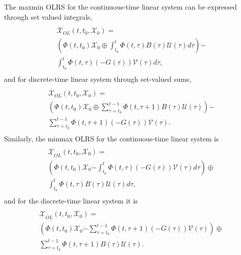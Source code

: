 \documentclass[letterpaper,10pt,english]{sphinxmanual}
\begin{document}
The maxmin OLRS for the continuous-time linear system can be expressed
through set valued integrals,
\label{chap_reach:equation-ctlsmaxmin}\begin{gather}
\begin{split}\begin{array}{l}
\overline{{\mathcal X}}_{OL}(t, t_0, {\mathcal X}_0) = \\
\left(\Phi(t, t_0){\mathcal X}_0 \oplus
\int_{t_0}^t\Phi(t, \tau)B(\tau){\mathcal U}(\tau)d\tau\right) \dot{-} \\
\int_{t_0}^t\Phi(t, \tau)(-G(\tau)){\mathcal V}(\tau)d\tau,
\end{array}\end{split}\label{chap_reach-ctlsmaxmin}
\end{gather}
and for discrete-time linear system through set-valued sums,
\label{chap_reach:equation-dtlsmaxmin}\begin{gather}
\begin{split}\begin{array}{l}
\overline{{\mathcal X}}_{OL}(t, t_0, {\mathcal X}_0) = \\
\left(\Phi(t, t_0){\mathcal X}_0 \oplus \sum_{\tau=t_0}^{t-1}\Phi(t, \tau+1)B(\tau){\mathcal U}(\tau)\right) \dot{-} \\
\sum_{\tau=t_0}^{t-1}\Phi(t, \tau+1)(-G(\tau)){\mathcal V}(\tau).
\end{array}\end{split}\label{chap_reach-dtlsmaxmin}
\end{gather}
Similarly, the minmax OLRS for the continuous-time linear system is
\label{chap_reach:equation-ctlsminmax}\begin{gather}
\begin{split}\begin{array}{l}
\underline{{\mathcal X}}_{OL}(t, t_0, {\mathcal X}_0) = \\
\left(\Phi(t, t_0){\mathcal X}_0 \dot{-}
\int_{t_0}^t\Phi(t, \tau)(-G(\tau)){\mathcal V}(\tau)d\tau\right)
\oplus \\
\int_{t_0}^t\Phi(t, \tau)B(\tau){\mathcal U}(\tau)d\tau,
\end{array}\end{split}\label{chap_reach-ctlsminmax}
\end{gather}
and for the discrete-time linear system it is
\label{chap_reach:equation-dtlsminmax}\begin{gather}
\begin{split}\begin{array}{l}
\underline{{\mathcal X}}_{OL}(t, t_0, {\mathcal X}_0) = \\
\left(\Phi(t, t_0){\mathcal X}_0 \dot{-} \sum_{\tau=t_0}^{t-1}\Phi(t, \tau+1)(-G(\tau)){\mathcal V}(\tau)\right) \oplus \\
\sum_{\tau=t_0}^{t-1}\Phi(t, \tau+1)B(\tau){\mathcal U}(\tau).
\end{array}\end{split}\label{chap_reach-dtlsminmax}
\end{gather}
\end{document}

